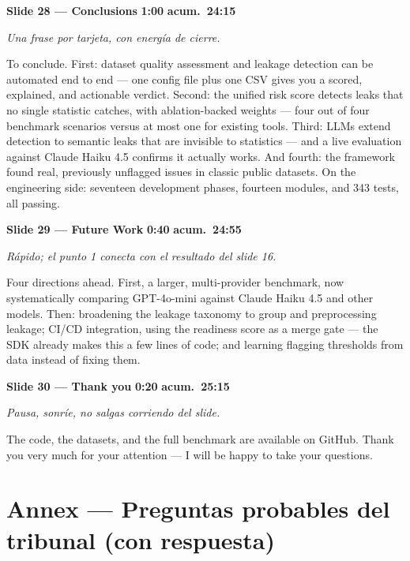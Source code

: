 \documentclass[11pt,a4paper]{article}
\newcommand{\slide}[6]{%
\begin{mdframed}[backgroundcolor=paleBlue, linecolor=upmBlue, linewidth=1pt,
                 roundcorner=4pt, skipabove=10pt, skipbelow=2pt,
                 innertopmargin=6pt, innerbottommargin=6pt]
\textbf{\color{upmBlue}Slide #1 --- #2}\hfill
\colorbox{upmOrange}{\color{white}\small\textbf{ #3 }}\;%
\colorbox{upmBlue}{\color{white}\small\textbf{ acum.\ #4 }}
\end{mdframed}
{\small\itshape\color{grayTxt}#5}\par\vspace{2pt}
#6\par\vspace{6pt}}
\begin{document}
\slide{28}{Conclusions}{1:00}{24:15}
{Una frase por tarjeta, con energía de cierre.}
{To conclude. First: dataset quality assessment and leakage detection can be
automated end to end --- one config file plus one CSV gives you a scored,
explained, and actionable verdict. Second: the unified risk score detects
leaks that no single statistic catches, with ablation-backed weights --- four
out of four benchmark scenarios versus at most one for existing tools. Third:
LLMs extend detection to semantic leaks that are invisible to statistics ---
and a live evaluation against Claude Haiku 4.5 confirms it actually works.
And fourth: the framework found real, previously unflagged issues in classic
public datasets. On the engineering side: seventeen development phases,
fourteen modules, and 343 tests, all passing.}

\slide{29}{Future Work}{0:40}{24:55}
{Rápido; el punto 1 conecta con el resultado del slide 16.}
{Four directions ahead. First, a larger, multi-provider benchmark, now
systematically comparing GPT-4o-mini against Claude Haiku 4.5 and other
models. Then: broadening the
leakage taxonomy to group and preprocessing leakage; CI/CD integration, using
the readiness score as a merge gate --- the SDK already makes this a few lines
of code; and learning flagging thresholds from data instead of fixing them.}

\slide{30}{Thank you}{0:20}{25:15}
{Pausa, sonríe, no salgas corriendo del slide.}
{The code, the datasets, and the full benchmark are available on GitHub.
Thank you very much for your attention --- I will be happy to take your
questions.}

\newpage
\section*{\color{upmBlue}Annex --- Preguntas probables del tribunal (con respuesta)}
\end{document}
